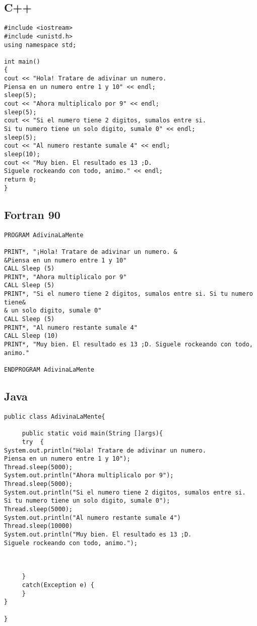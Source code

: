 \documentclass[notitlepage,12pt]{article}
\begin{document}
\subsection{C++}
\begin{verbatim}
#include <iostream>
#include <unistd.h>
using namespace std;

int main()
{
cout << "Hola! Tratare de adivinar un numero. 
Piensa en un numero entre 1 y 10" << endl; 
sleep(5);
cout << "Ahora multiplicalo por 9" << endl;
sleep(5);
cout << "Si el numero tiene 2 digitos, sumalos entre si. 
Si tu numero tiene un solo digito, sumale 0" << endl;
sleep(5);
cout << "Al numero restante sumale 4" << endl;
sleep(10);
cout << "Muy bien. El resultado es 13 ;D. 
Siguele rockeando con todo, animo." << endl;
return 0;
}
\end{verbatim}
\subsection{Fortran 90}
\begin{verbatim}
PROGRAM AdivinaLaMente

PRINT*, "¡Hola! Tratare de adivinar un numero. &
&Piensa en un numero entre 1 y 10"
CALL Sleep (5)
PRINT*, "Ahora multiplicalo por 9"
CALL Sleep (5)
PRINT*, "Si el numero tiene 2 digitos, sumalos entre si. Si tu numero tiene&
& un solo digito, sumale 0"
CALL Sleep (5)
PRINT*, "Al numero restante sumale 4"
CALL Sleep (10)
PRINT*, "Muy bien. El resultado es 13 ;D. Siguele rockeando con todo, animo."

ENDPROGRAM AdivinaLaMente
\end{verbatim}
\subsection{Java}
\begin{verbatim}
public class AdivinaLaMente{

     public static void main(String []args){
	 try  {
System.out.println("Hola! Tratare de adivinar un numero. 
Piensa en un numero entre 1 y 10");
Thread.sleep(5000);
System.out.println("Ahora multiplicalo por 9");
Thread.sleep(5000);
System.out.println("Si el numero tiene 2 digitos, sumalos entre si. 
Si tu numero tiene un solo digito, sumale 0");
Thread.sleep(5000);
System.out.println("Al numero restante sumale 4")
Thread.sleep(10000)
System.out.println("Muy bien. El resultado es 13 ;D. 
Siguele rockeando con todo, animo.");



     }
	 catch(Exception e) {
	 }
}

}
\end{verbatim}
\end{document}
